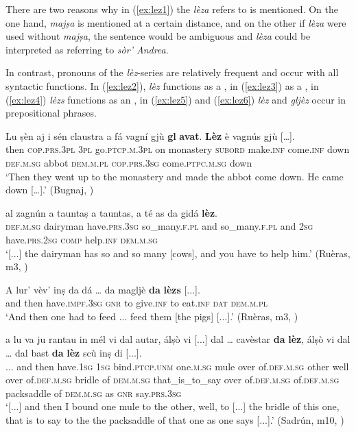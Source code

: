 There are two reasons why in (\ref{ex:lez1}) the  \textit{lèza} refers to is mentioned. On the one hand, \textit{majṣa} is mentioned at a certain distance, and on the other if \textit{lèza} were used without \textit{majṣa}, the sentence would be ambiguous and \textit{lèza} could be interpreted as referring to \textit{sòr' Andrea}.
 
 In contrast, pronouns of the \textit{lèz}-series are relatively frequent and occur with all syntactic functions. In (\ref{ex:lez2}), \textit{lèz} functions as a , in (\ref{ex:lez3}) as a , in (\ref{ex:lez4}) \textit{lèzs} functions as an , in (\ref{ex:lez5}) and (\ref{ex:lez6}) \textit{lèz} and \textit{gljèz} occur in prepositional phrases.
 
\ea
\label{ex:lez2}
\gll Lu ṣèn aj i sén claustra a fá vagní gjù \textbf{gl} \textbf{avat}. \textbf{Lèz} è vagnús gjù […].\\
     then \textsc{cop.prs.3pl} \textsc{3pl} go.\textsc{ptcp.m.3pl} on monastery \textsc{subord} make.\textsc{inf} come.\textsc{inf} down \textsc{def.m.sg} abbot \textsc{dem.m.pl} \textsc{cop.prs.3sg} come.\textsc{ptpc.m.sg} down\\
\glt `Then they went up to the monastery and made the abbot come down. He came down […].' (Bugnaj, \citealt[132]{Büchli1966})
\z

\ea
\label{ex:lez3}
	\gll [...] al zagnún a tauntaṣ a tauntas, a té as da gidá \textbf{lèz}.\\
{} \textsc{def.m.sg} dairyman have\textsc{.prs.3sg} so\_many.\textsc{f.pl} and so\_many.\textsc{f.pl} and \textsc{2sg} have.\textsc{prs.2sg} \textsc{comp} help.\textsc{inf} \textsc{dem.m.sg}	\\
\glt `[...] the dairyman has so and so many [cows], and you have to help him.' (Ruèras, m3, )
\z

\ea
\label{ex:lez4}
\gll A lur' vèv’ inṣ da dá … da magljè \textbf{da} \textbf{lèzs} [...].\\
and then have.\textsc{impf.3sg} \textsc{gnr} to give.\textsc{inf} {} to eat.\textsc{inf} \textsc{dat} \textsc{dem.m.pl}\\
\glt `And then one had to feed ... feed them [the pigs] [...].' (Ruèras, m3, )
\z

\ea\label{ex:lez5}
\gll  [...] a lu va ju rantau in mél vi dal autar,  álṣò vi [...] dal … cavèstar \textbf{da} \textbf{lèz}, álṣò vi dal … dal bast \textbf{da} \textbf{lèz} scù inṣ di [...].  \\
{...} and then have.\textsc{1sg} \textsc{1sg} bind.\textsc{ptcp.unm} one.\textsc{m.sg} mule over of.\textsc{def.m.sg} other well over {} of.\textsc{def.m.sg} {} bridle of \textsc{dem.m.sg} that\_is\_to\_say over of.\textsc{def.m.sg} {} of.\textsc{def.m.sg} packsaddle of \textsc{dem.m.sg} as \textsc{gnr}  say.\textsc{prs.3sg} \\
\glt `[...] and then I bound one mule to the other, well, to [...] the bridle of this one, that is to say to the the packsaddle of that one as one says [...].' (Sadrún, m10, )
\z

